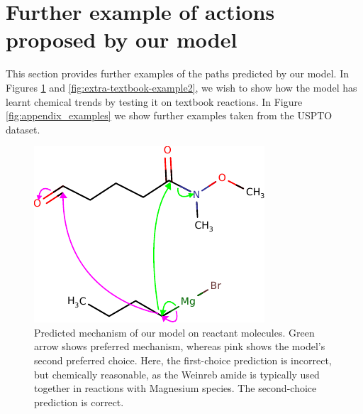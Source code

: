 


\FloatBarrier
\section{Further example of actions proposed by our model}

This section provides further examples of the paths predicted by our model.
In Figures  \ref{fig:extra-textbook-example} and \ref{fig:extra-textbook-example2}, we wish to show how the model has learnt chemical trends by testing it on textbook reactions.
In Figure \ref{fig:appendix_examples} we show further examples taken from the USPTO dataset.


\begin{figure}[h]
        \centering
        \includegraphics{imgs/textbook/reactants2}
        \caption{Predicted mechanism of our model on reactant molecules. Green arrow shows preferred mechanism, whereas pink shows the model's second preferred choice. Here, the first-choice prediction is incorrect, but chemically reasonable, as the Weinreb amide is typically used together in reactions with Magnesium species. The second-choice prediction is correct.}
        \label{fig:extra-textbook-example}
\end{figure}

